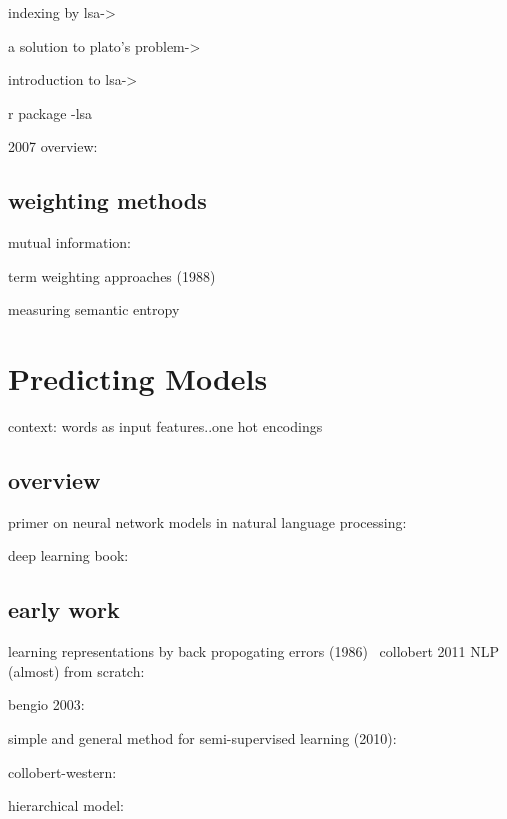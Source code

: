 indexing by lsa->~\cite{deerwester-1990-indexing-by-lsa}

a solution to plato's problem->~\cite{landauer_1997_a_solution}

introduction to lsa->~\cite{landauer_1998_an_introduction_lsa}

r package -lsa~\cite{wild-2007-investigating-unstructured-texts-with-lsa}

2007 overview:~\cite{wild-2007-investigating-unstructured-texts-with-lsa}


\subsection{weighting methods}
mutual information:~\cite{church-hanks-1990-word}

term weighting approaches (1988)~\cite{salton_1988_term_weighting_approaches}

measuring semantic entropy~\cite{melamed_2002_measuringsemantic}

\section{Predicting Models}
context: words as input features..one hot encodings

\subsection{overview}
primer on neural network models in natural language processing:~\cite{goldberg15_primer_neural_networ_model_natur_languag_proces}

deep learning book:~\cite{goodfellow-et-al-2016-deep-learning}


\subsection{early work}
learning representations by back propogating errors (1986)~\cite{rumelhart-1986-learning-representations}
collobert 2011 NLP (almost) from scratch:~\cite{collobert-2011-natural}

bengio 2003:~\cite{bengio-2003-a-neural-prob-lang-model}

simple and general method for semi-supervised learning (2010):~\cite{turian-etal-2010-word}

collobert-western:~\cite{collobert-2008-a-unified-architecture}

hierarchical model:~\cite{morin-2005-hierarchical-probabilistic}

